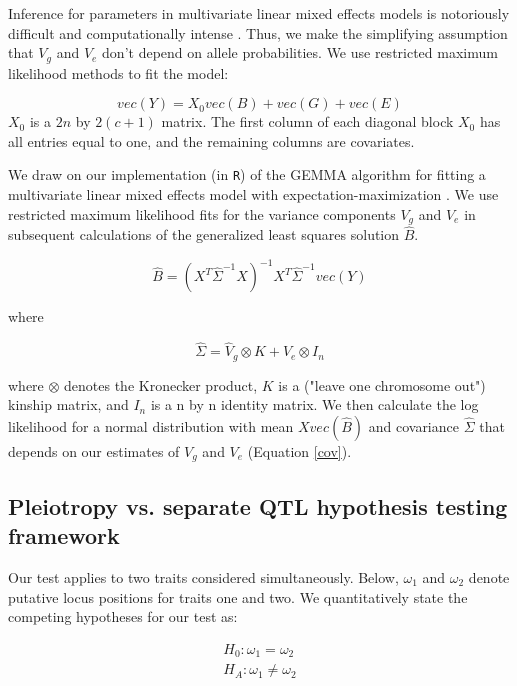 \documentclass[12pt,twoside, lineno]{gsajnl}
\begin{document}
Inference for parameters in multivariate linear mixed effects models is notoriously difficult and computationally intense \citep{meyer1989restricted,meyer1991estimating}. Thus, we make the simplifying assumption that $V_g$ and $V_e$ don't depend on allele probabilities. We use restricted maximum likelihood methods to fit the model:

\begin{equation}
vec(Y) = X_0vec(B) + vec(G) + vec(E)
\label{model}
\end{equation}
$X_0$ is a $2n$ by $2(c + 1)$ matrix. The first column of each diagonal block $X_0$ has all entries equal to one, and the remaining columns are covariates.

We draw on our implementation \citep{gemma2} (in \texttt{R}) of the GEMMA algorithm for fitting a multivariate linear mixed effects model with expectation-maximization \citep{zhou2014efficient}. We use restricted maximum likelihood fits for the variance components $V_g$ and $V_e$ in subsequent calculations of the generalized least squares solution $\hat B$.

\begin{equation}
    \hat B = (X^T\hat\Sigma^{-1}X)^{-1}X^T\hat\Sigma^{-1}vec(Y)
\end{equation}

\noindent where

\begin{equation}
    \hat\Sigma = \hat V_g \otimes K + \hat V_e \otimes I_n
    \label{cov}
\end{equation}

\noindent where $\otimes$ denotes the Kronecker product, $K$ is a ("leave one chromosome out") kinship matrix, and $I_n$ is a n by n identity matrix. We then calculate the log likelihood for a normal distribution with mean $X vec(\hat B)$ and covariance $\hat \Sigma$ that depends on our estimates of $V_g$ and $V_e$ (Equation \ref{cov}).

\subsection{Pleiotropy vs. separate QTL hypothesis testing framework}

Our test applies to two traits considered simultaneously. Below, $\omega_1$ and $\omega_2$ denote putative locus positions for traits one and two. We quantitatively state the competing hypotheses for our test as:

\begin{eqnarray}
H_0: \omega_1 = \omega_2 \nonumber\\
H_A: \omega_1 \neq \omega_2
\label{eqn:hypotheses}
\end{eqnarray}
\end{document}
